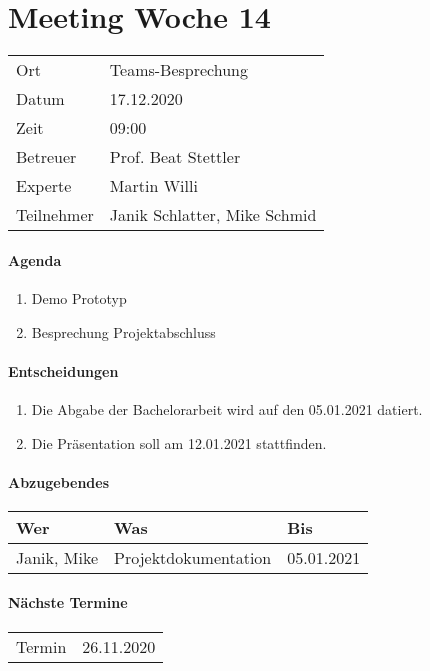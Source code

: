 \section*{Meeting Woche 14}

\begin{table}[h!]
	\begin{tabularx}{\textwidth}{l X }
		Ort & Teams-Besprechung \\
		Datum & 17.12.2020 \\
		Zeit & 09:00 \\
        Betreuer & Prof. Beat Stettler\\
        Experte & Martin Willi \\
		Teilnehmer & Janik Schlatter, Mike Schmid \\
	\end{tabularx}
\end{table}

\paragraph{Agenda}
\begin{enumerate}
	\item Demo Prototyp
	\item Besprechung Projektabschluss
\end{enumerate}

\paragraph{Entscheidungen}
\begin{enumerate}
    \item Die Abgabe der Bachelorarbeit wird auf den 05.01.2021 datiert.
    \item Die Präsentation soll am 12.01.2021 stattfinden.
\end{enumerate}

\paragraph{Abzugebendes}
\begin{tabbing}
	\begin{tabu} to \linewidth {l X l }
        \toprule
        \textbf{Wer} & \textbf{Was} & \textbf{Bis} \\
		\midrule
		Janik, Mike & Projektdokumentation & 05.01.2021 \\
		\bottomrule
    \end{tabu}
\end{tabbing}

\paragraph{Nächste Termine} \hfill
\begin{table}[h!]
	\begin{tabularx}{\textwidth}{l X }
		Termin & 26.11.2020 \\
	\end{tabularx}
\end{table}

\clearpage